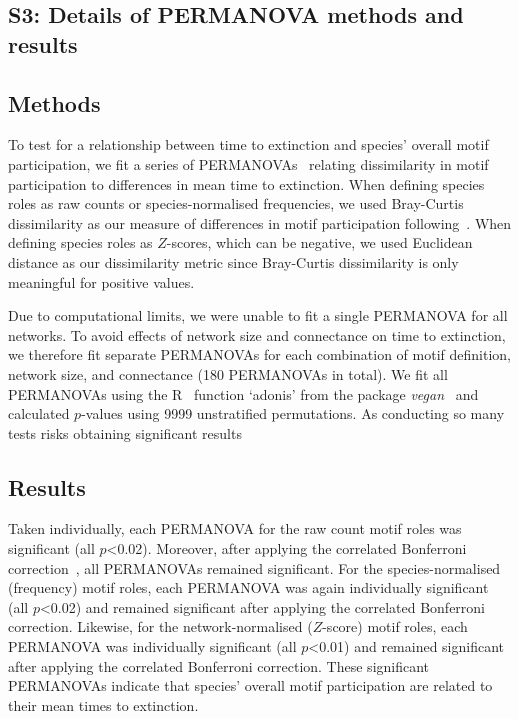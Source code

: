 \documentclass[12pt]{article}
\begin{document}
\begin{spacing}{2.0}
\clearpage


\section*{S3: Details of PERMANOVA methods and results}

	\subsection*{Methods}


		To test for a relationship between time to extinction and species' overall motif participation, we fit a series of PERMANOVAs~\citep{Anderson2001} relating dissimilarity in motif participation to differences in mean time to extinction.
		When defining species roles as raw counts or species-normalised frequencies, we used Bray-Curtis dissimilarity as our measure of differences in motif participation following~\citet{Baker2015,Cirtwill2015}.
		When defining species roles as $Z$-scores, which can be negative, we used Euclidean distance as our dissimilarity metric since Bray-Curtis dissimilarity is only meaningful for positive values.


		Due to computational limits, we were unable to fit a single PERMANOVA for all networks.
		To avoid effects of network size and connectance on time to extinction, we therefore fit separate PERMANOVAs for each combination of motif definition, network size, and connectance (180 PERMANOVAs in total).
		We fit all PERMANOVAs using the R~\citep{R} function `adonis' from the package \emph{vegan}~\citep{vegan} and calculated $p$-values using 9999 unstratified permutations.
		As conducting so many tests risks obtaining significant results 
	\subsection*{Results}


		Taken individually, each PERMANOVA for the raw count motif roles was significant (all $p$\textless0.02). Moreover, after applying the correlated Bonferroni correction~\citep{Drezner2016}, all PERMANOVAs remained significant.
		For the species-normalised (frequency) motif roles, each PERMANOVA was again individually significant (all $p$\textless0.02) and remained significant after applying the correlated Bonferroni correction.
		Likewise, for the network-normalised ($Z$-score) motif roles, each PERMANOVA was individually significant (all $p$\textless0.01) and remained significant after applying the correlated Bonferroni correction.
		These significant PERMANOVAs indicate that species' overall motif participation are related to their mean times to extinction.


\end{spacing}
\end{document}

